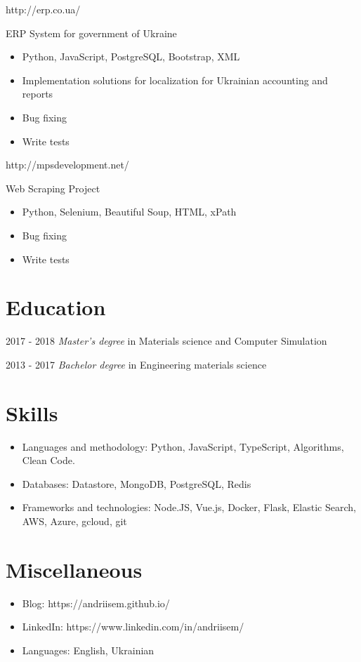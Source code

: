 \documentclass{resume}
\begin{document}

http://erp.co.ua/

ERP System for government of Ukraine 
\begin{itemize}
  \item Python, JavaScript, PostgreSQL, Bootstrap, XML
  \item Implementation solutions for localization for Ukrainian accounting and reports
  \item Bug fixing
  \item Write tests
\end{itemize}


http://mpsdevelopment.net/

Web Scraping Project
\begin{itemize}
  \item Python, Selenium, Beautiful Soup, HTML, xPath
  \item Bug fixing
  \item Write tests
\end{itemize}

\section{Education}
 {2017 - 2018}
\textit{Master's degree} in Materials science and Computer Simulation

 {2013 - 2017}
\textit{Bachelor degree} in Engineering materials science 

\section{Skills}
\begin{itemize}[parsep=0.5ex]
    \item Languages and methodology: Python, JavaScript, TypeScript, Algorithms, Clean Code.
    \item Databases: Datastore, MongoDB, PostgreSQL, Redis
    \item Frameworks and technologies: Node.JS, Vue.js, Docker, Flask, Elastic Search, AWS, Azure, gcloud, git
\end{itemize}

\section{Miscellaneous}
\begin{itemize}[parsep=0.5ex]
  \item Blog: https://andriisem.github.io/
  \item LinkedIn: https://www.linkedin.com/in/andriisem/
  \item Languages: English, Ukrainian
\end{itemize}
\end{document}
